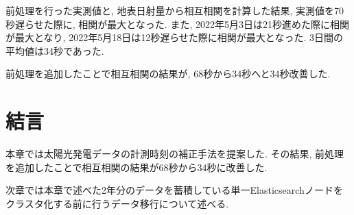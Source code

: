 前処理を行った実測値と, 地表日射量から相互相関を計算した結果, 実測値を70秒遅らせた際に, 相関が最大となった. また, 2022年5月3日は21秒進めた際に相関が最大となり, 2022年5月18日は12秒遅らせた際に相関が最大となった. 3日間の平均値は34秒であった.

前処理を追加したことで相互相関の結果が, 68秒から34秒へと34秒改善した.

\section{結言}
本章では太陽光発電データの計測時刻の補正手法を提案した. その結果, 前処理を追加したことで相互相関の結果が68秒から34秒に改善した.

次章では本章で述べた2年分のデータを蓄積している単一Elasticsearchノードをクラスタ化する前に行うデータ移行について述べる.